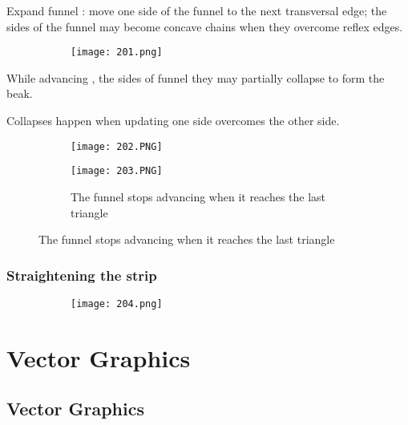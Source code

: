 \documentclass{article}
\begin{document}
\vspace{30mm}

Expand funnel : move one side of the funnel to the next transversal edge; the sides of the funnel may become concave chains when they overcome reflex edges.

 \begin{figure}[ht!]
  \centering
  \begin{subfigure}[b]{0.3\linewidth}
    \texttt{[image: 201.png]}
  \end{subfigure}
\end{figure}

While advancing , the sides of funnel they may partially collapse to form the beak.

Collapses happen when updating one side overcomes the other side.

\begin{figure}[ht!]
  \centering
  \begin{subfigure}[b]{0.29\linewidth}
    \texttt{[image: 202.PNG]}
  \end{subfigure}
     \begin{subfigure}[b]{0.39\textwidth}
         \centering
         \texttt{[image: 203.PNG]}
         \caption{The funnel stops advancing when it reaches the last triangle}
     \end{subfigure}
\end{figure}

\subsubsection{Straightening the strip}

\begin{figure}[ht!]
  \centering
  \begin{subfigure}[b]{0.8\linewidth}
    \texttt{[image: 204.png]}
  \end{subfigure}
\end{figure}

\vspace{40mm}

\section{Vector Graphics}

\subsection{Vector Graphics}
\end{document}
